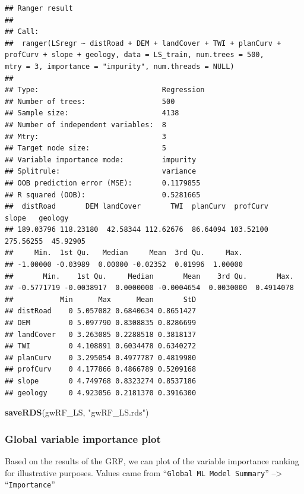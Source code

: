\documentclass[
]{article}
\newenvironment{Shaded}{\begin{snugshade}}{\end{snugshade}}
\newcommand{\FunctionTok}[1]{\textcolor[rgb]{0.13,0.29,0.53}{\textbf{#1}}}
\newcommand{\NormalTok}[1]{#1}
\newcommand{\StringTok}[1]{\textcolor[rgb]{0.31,0.60,0.02}{#1}}
\begin{document}
\begin{verbatim}
## Ranger result
## 
## Call:
##  ranger(LSregr ~ distRoad + DEM + landCover + TWI + planCurv +      profCurv + slope + geology, data = LS_train, num.trees = 500,      mtry = 3, importance = "impurity", num.threads = NULL) 
## 
## Type:                             Regression 
## Number of trees:                  500 
## Sample size:                      4138 
## Number of independent variables:  8 
## Mtry:                             3 
## Target node size:                 5 
## Variable importance mode:         impurity 
## Splitrule:                        variance 
## OOB prediction error (MSE):       0.1179855 
## R squared (OOB):                  0.5281665 
##  distRoad       DEM landCover       TWI  planCurv  profCurv     slope   geology 
## 189.03796 118.23180  42.58344 112.62676  86.64094 103.52100 275.56255  45.92905 
##     Min.  1st Qu.   Median     Mean  3rd Qu.     Max. 
## -1.00000 -0.03989  0.00000 -0.02352  0.01996  1.00000 
##       Min.    1st Qu.     Median       Mean    3rd Qu.       Max. 
## -0.5771719 -0.0038917  0.0000000 -0.0004654  0.0030000  0.4914078 
##           Min      Max      Mean       StD
## distRoad    0 5.057082 0.6840634 0.8651427
## DEM         0 5.097790 0.8308835 0.8286699
## landCover   0 3.263085 0.2288518 0.3818137
## TWI         0 4.108891 0.6034478 0.6340272
## planCurv    0 3.295054 0.4977787 0.4819980
## profCurv    0 4.177866 0.4866789 0.5209168
## slope       0 4.749768 0.8323274 0.8537186
## geology     0 4.923056 0.2181370 0.3916300
\end{verbatim}

\begin{Shaded}
\begin{Highlighting}[]
\FunctionTok{saveRDS}\NormalTok{(gwRF\_LS, }\StringTok{"gwRF\_LS.rds"}\NormalTok{)}
\end{Highlighting}
\end{Shaded}

\subsubsection{Global variable importance plot}\label{global-variable-importance-plot}

Based on the results of the GRF, we can plot of the variable importance ranking for illustrative purposes.
Values came from ``\texttt{Global\ ML\ Model\ Summary}'' --\textgreater{} ``\texttt{Importance}''
\end{document}
